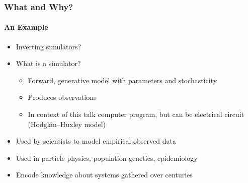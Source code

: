 \documentclass[9pt]{beamer}
\begin{document}
\begin{frame}
\frametitle{What and Why?}
\framesubtitle{An Example}
\begin{itemize}
	\item Inverting simulators?%
	\item What is a simulator? %
	\begin{itemize}
		\item Forward, generative model with parameters and stochasticity
		\item Produces observations
		\item In context of this talk computer program, but can be electrical circuit (Hodgkin–Huxley model)
	\end{itemize}
	\item Used by scientists to model empirical observed data
	\item Used in particle physics, population genetics, epidemiology
	\item Encode knowledge about systems gathered over centuries
\end{itemize}
\end{frame} 
\end{document}
